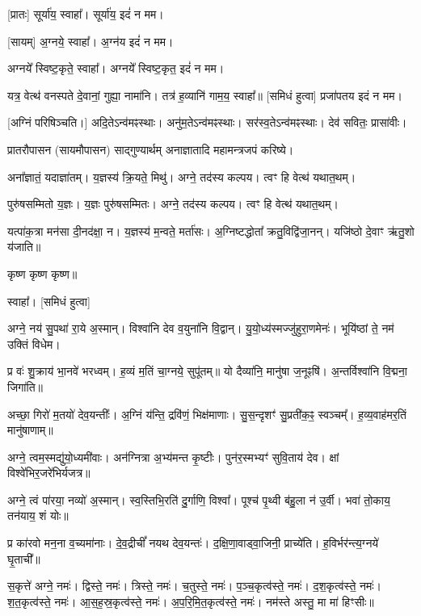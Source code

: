 [प्रातः] सूर्या॑य॒ स्वाहा᳚। सूर्या॑य॒ इदं॑ न मम।

[सायम्] अ॒ग्नये॒ स्वाहा᳚। अ॒ग्न॑य इदं॑ न मम।

अग्नये᳚ स्विष्ट॒कृते॒ स्वाहा᳚। अग्नये᳚ स्विष्ट॒कृत॒ इदं॑ न मम।


यत्र॒ वेत्थ॑ वनस्पते दे॒वानां॒ गुह्या॒ नामा॑नि। तत्र॑ ह॒व्यानि॑ गाम॒य॒ स्वाहा᳚॥ [समिधं हुत्वा]
प्रजा॑पतय इदं न मम। 

[अग्निं परिषिञ्चति।]
अदि॒तेऽन्व॑मꣴस्थाः। अनु॑म॒तेऽन्व॑मꣴस्थाः। सर॑स्व॒तेऽन्व॑मꣴस्थाः। देव॑ सवितः॒ प्रासा॑वीः।


प्रातरौपासन (सायमौपासन) साद्गुण्यार्थम् अनाज्ञातादि महामन्त्रजपं करिष्ये।

अना᳚ज्ञातं॒ यदाज्ञा॑तम्। य॒ज्ञस्य॑ क्रि॒यते॒ मिथु॑।
अग्ने॒ तद॑स्य कल्पय। त्वꣳ हि वेत्थ॑ यथात॒थम्।

पुरु॑षसम्मितो य॒ज्ञः। य॒ज्ञः पुरु॑षसम्मितः।
अग्ने॒ तद॑स्य कल्पय। त्वꣳ हि वेत्थ॑ यथात॒थम्।

यत्पा॑क॒त्रा मन॑सा दी॒नद॑क्षा॒ न। य॒ज्ञस्य॑ म॒न्वते॒ मर्ता॑सः।
अ॒ग्निष्टद्धोता᳚ क्रतु॒विद्वि॑जा॒नन्। यजि॑ष्ठो दे॒वाꣳ ऋ॑तु॒शो य॑जाति॥

कृष्ण कृष्ण कृष्ण॥

स्वाहा᳚। [समिधं हुत्वा]


अग्ने॒ नय॑ सु॒पथा॑ रा॒ये अ॒स्मान्। विश्वा॑नि देव व॒युना॑नि वि॒द्वान्। यु॒यो॒ध्य॑स्मज्जु॑हुरा॒णमेनः॑। भूयि॑ष्ठां ते॒ नम॑ उक्तिं विधेम। 

प्र वः॑ शु॒क्राय॑ भा॒नवे॑ भरध्वम्। ह॒व्यं म॒तिं चा॒ग्नये॒ सुपू॑तम्॥ यो दैव्या॑नि॒ मानु॑षा ज॒नूꣴषि॑। अ॒न्तर्विश्वा॑नि वि॒द्मना॒ जिगा॑ति॥

अच्छा॒ गिरो॑ म॒तयो॑ देव॒यन्तीः᳚। अ॒ग्निं य॑न्ति॒ द्रवि॑णं॒ भिक्ष॑माणाः।
सु॒स॒न्दृशꣳ॑ सु॒प्रती॑क॒ꣴ॒ स्वञ्चम्᳚। ह॒व्य॒वाह॑मर॒तिं मानु॑षाणाम्॥

अग्ने॒ त्वम॒स्मद्यु॑यो॒ध्यमी॑वाः। अन॑ग्नित्रा अ॒भ्य॑मन्त कृ॒ष्टीः।
पुन॑र॒स्मभ्यꣳ॑ सुवि॒ताय॑ देव। क्षां विश्वे॑भिर॒जरे॑भिर्यजत्र॥ 

अग्ने॒ त्वं पा॑रया॒ नव्यो॑ अ॒स्मान्। स्व॒स्तिभि॒रति॑ दु॒र्गाणि॒ विश्वा᳚।
पूश्च॑ पृ॒थ्वी ब॑हु॒ला न॑ उ॒र्वी। भवा॑ तो॒काय॒ तन॑याय॒ शं योः॥

प्र का॑रवो मन॒ना व॒च्यमा॑नाः। दे॒व॒द्रीचीं᳚ नयथ देव॒यन्तः॑।
द॒क्षि॒णा॒वाड्वा॒जिनी॒ प्राच्ये॑ति। ह॒विर्भर॑न्त्य॒ग्नये॑ घृ॒ताची᳚॥

स॒कृत्ते॑ अग्ने॒ नमः॑। द्विस्ते॒ नमः॑। त्रिस्ते॒ नमः॑। च॒तुस्ते॒ नमः॑। प॒ञ्च॒कृत्व॑स्ते॒ नमः॑। द॒श॒कृत्व॑स्ते॒ नमः॑। श॒त॒कृत्व॑स्ते॒ नमः॑। आ॒स॒ह॒स्र॒कृत्व॑स्ते॒ नमः॑। अ॒प॒रि॒मि॒त॒कृत्व॑स्ते॒ नमः॑। नम॑स्ते अस्तु॒ मा मा॑ हिꣳसीः॥

